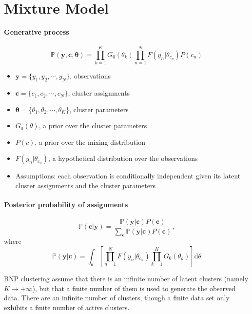 \section{\fontsize{12}{12}\selectfont Mixture Model}

\paragraph{Generative process}

\begin{equation}
\mathbb{P} (\mathbf{y}, \mathbf{c}, \bm \theta) = \prod_{k=1}^K G_0 (\theta_k) \prod_{n=1}^N F(y_n | \theta_{c_n}) P(c_n)
\end{equation}

\begin{itemize}
\item $\mathbf{y} = \{y_1, y_2, \cdots, y_N \}$, observations
\item $\mathbf{c} = \{c_1, c_2, \cdots, c_N \}$, cluster assignments
\item $\bm \theta = \{\theta_1, \theta_2, \cdots, \theta_K \}$, cluster parameters
\item $G_0(\theta)$, a prior over the cluster parameters
\item $P(c)$, a prior over the mixing distribution
\item $F(y_n|\theta_{c_n})$, a hypothetical distribution over the observations
\item Assumptions: each observation is conditionally independent given its latent cluster assignments and the cluster parameters
\end{itemize}

\paragraph{Posterior probability of assignments}

\begin{equation}
\mathbb{P} (\mathbf{c} | \mathbf{y}) = \frac{\mathbb{P}(\mathbf{y} | \mathbf{c}) P(\mathbf{c})}{\sum_{\mathbf{c}} \mathbb{P}(\mathbf{y} | \mathbf{c}) P(\mathbf{c})},
\end{equation}
where
\begin{equation}
\mathbb{P}(\mathbf{y} | \mathbf{c}) = \int_\theta \left[ \prod_{n=1}^N F(y_n | \theta_{c_n}) \prod_{k=1}^K G_0 (\theta_k) \right] \text{d} \theta
\end{equation}


BNP clustering assume that there is an infinite number of latent clusters (namely $K \rightarrow +\infty$), but that a finite number of them is used to generate the observed data. There are an infinite number of clusters, though a finite data set only exhibits a finite number of active clusters.
